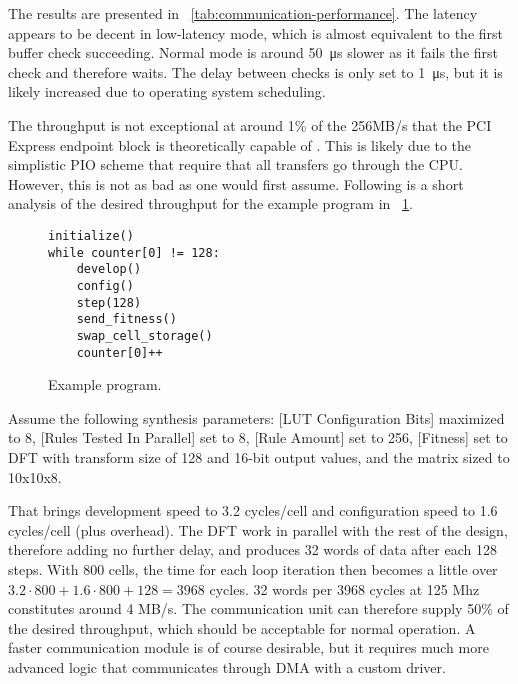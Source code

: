 The results are presented in \tablename~\ref{tab:communication-performance}.
The latency appears to be decent in low-latency mode, which is almost equivalent to the first buffer check succeeding.
Normal mode is around \SI{50}{\micro\second} slower as it fails the first check and therefore waits.
The delay between checks is only set to \SI{1}{\micro\second}, but it is likely increased due to operating system scheduling.

The throughput is not exceptional at around 1\% of the 256MB/s that the PCI Express endpoint block is theoretically capable of \cite{ug672}.
This is likely due to the simplistic PIO scheme that require that all transfers go through the CPU.
However, this is not as bad as one would first assume.
Following is a short analysis of the desired throughput for the example program in \figurename~\ref{fig:example-program}.

\begin{figure}[!ht]
\begin{lstlisting}[xleftmargin=0.35\textwidth]
initialize()
while counter[0] != 128:
    develop()
    config()
    step(128)
    send_fitness()
    swap_cell_storage()
    counter[0]++
\end{lstlisting}
\caption[Example program] {
    Example program.
}
\label{fig:example-program}
\end{figure}

Assume the following synthesis parameters:
[LUT Configuration Bits] maximized to 8,
[Rules Tested In Parallel] set to 8,
[Rule Amount] set to 256,
[Fitness] set to DFT with transform size of 128 and 16-bit output values,
and the matrix sized to 10x10x8.

That brings development speed to 3.2 cycles/cell and configuration speed to 1.6 cycles/cell (plus overhead)\footnotemark.
The DFT work in parallel with the rest of the design, therefore adding no further delay, and produces 32 words of data after each 128 steps.
With 800 cells, the time for each loop iteration then becomes a little over $3.2 \cdot 800 + 1.6 \cdot 800 + 128 = 3968$ cycles.
32 words per 3968 cycles at 125 Mhz constitutes around 4 MB/s.
The communication unit can therefore supply 50\% of the desired throughput, which should be acceptable for normal operation.
A faster communication module is of course desirable, but it requires much more advanced logic that communicates through DMA with a custom driver.


